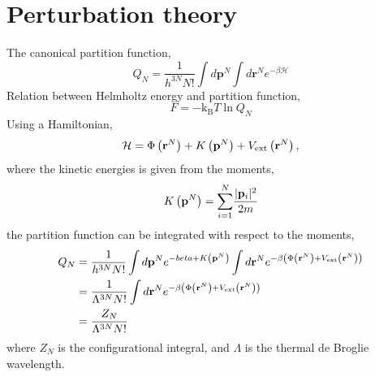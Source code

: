 \documentclass[12pt, letterpaper]{article}
\newcommand*{\abs}[1]{\lvert#1\rvert}
\newcommand*{\lb}{\ensuremath{\left(}}
\newcommand*{\rb}{\ensuremath{\right)}}
\newcommand{\rvec}{\ensuremath{\mathbf{r}}\xspace}
\newcommand{\pvec}{\ensuremath{\mathbf{p}}\xspace}
\newcommand{\kB}{\ensuremath{\text{k}_{\text{B}}}\xspace}
\newcommand{\external}{\ensuremath{\text{ext}}\xspace}
\begin{document}
\section{Perturbation theory}
The canonical partition function,
\begin{equation}
  Q_N = \frac{1}{h^{3N}N!}\int d \mathbf{p}^N \int d \rvec^N e^{-\beta \mathcal{H}}
\end{equation}
Relation between Helmholtz energy and partition function,
\begin{equation}
  \label{eq:helm_statmec}
  F = -\kB T \ln Q_N
\end{equation}
Using a Hamiltonian,
\begin{equation}
  \mathcal{H} = \Phi \lb \rvec^N \rb + K\lb \pvec^N \rb + V_\external \lb \rvec^N \rb,
\end{equation}
where the kinetic energies is given from the moments,
\begin{equation}
  K\lb \pvec^N \rb = \overset{N}{\underset{i=1}{\sum}} \frac{\abs{\pvec_i}^2}{2 m}
\end{equation}
the partition function can be integrated with respect to the moments,
\begin{align}
  Q_N &= \frac{1}{h^{3N}N!}\int d \mathbf{p}^N e^{-beta + K\lb \pvec^N \rb } \int d \rvec^N e^{-\beta \lb \Phi \lb \rvec^N \rb + V_\external \lb \rvec^N \rb \rb} \nonumber \\
      &= \frac{1}{\Lambda^{3N}N!} \int d \rvec^N e^{-\beta \lb \Phi \lb \rvec^N \rb + V_\external \lb \rvec^N \rb \rb} \nonumber\\
  &= \frac{Z_N}{\Lambda^{3N}N!}
\end{align}
where $Z_N$ is the configurational integral, and $\Lambda$ is the
thermal de Broglie wavelength.
\end{document}
